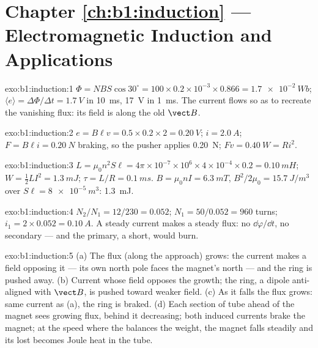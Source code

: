 \section*{Chapter \ref{ch:b1:induction} --- Electromagnetic Induction and Applications}

\begin{solution}{exo:b1:induction:1}
$\Phi = NBS\cos30^\circ = 100 \times 0.2 \times 10^{-3} \times 0.866 = \qty{1.7e-2}{Wb}$;
$\langle e\rangle = \Delta\Phi/\Delta t = \qty{1.7}{V}$ in \qty{10}{ms}, \qty{17}{V} in
\qty{1}{ms}. The current flows so as to recreate the vanishing flux: its
field is along the old $\vect B$.
\end{solution}

\begin{solution}{exo:b1:induction:2}
$e = B\ell v = 0.5 \times 0.2 \times 2 = \qty{0.20}{V}$; $i = \qty{2.0}{A}$; $F = B\ell i =
\qty{0.20}{N}$ braking, so the pusher applies \qty{0.20}{N}; $Fv = \qty{0.40}{W}
= Ri^2$.
\end{solution}

\begin{solution}{exo:b1:induction:3}
$L = \mu_0n^2S\ell = 4\pi \times 10^{-7} \times 10^6 \times 4 \times 10^{-4} \times 0.2 =
\qty{0.10}{mH}$; $W = \tfrac12LI^2 = \qty{1.3}{mJ}$; $\tau = L/R = \qty{0.1}{ms}$.
$B = \mu_0nI = \qty{6.3}{mT}$, $B^2/2\mu_0 = \qty{15.7}{J/m^3}$ over
$S\ell = \qty{8e-5}{m^3}$: \qty{1.3}{mJ}.
\end{solution}

\begin{solution}{exo:b1:induction:4}
$N_2/N_1 = 12/230 = 0.052$; $N_1 = 50/0.052 = 960$ turns; $i_1 = 2 \times 0.052 =
\qty{0.10}{A}$. A steady current makes a steady flux: no $\dd\varphi/\dd t$, no
secondary  --- and the primary, a short, would burn.
\end{solution}

\begin{solution}{exo:b1:induction:5}
(a) The flux (along the approach) grows: the current makes a field
opposing it --- its own north pole faces the magnet's north --- and the
ring is pushed away. (b) Current whose field opposes the growth; the
ring, a dipole anti-aligned with $\vect B$, is pushed toward weaker
field. (c) As it falls the flux grows: same current as (a), the ring is
braked. (d) Each section of tube ahead of the magnet sees growing flux,
behind it decreasing; both induced currents brake the magnet; at the
speed where the  balances the weight, the magnet falls
steadily and its lost  becomes Joule heat in the tube.
\end{solution}

